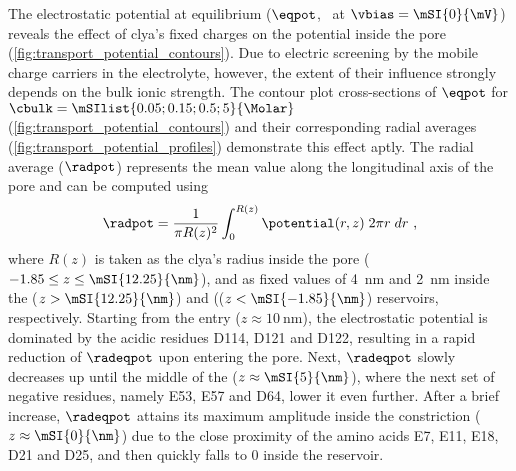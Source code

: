 The electrostatic potential at equilibrium ($\eqpot$, \ie~at $\vbias = \mSI{0}{\mV}$) reveals the effect of
\gls{clya}'s fixed charges on the potential inside the pore (\cref{fig:transport_potential_contours}). Due to
electric screening by the mobile charge carriers in the electrolyte, however, the extent of their influence
strongly depends on the bulk ionic strength. The contour plot cross-sections of $\eqpot$ for $\cbulk =
\mSIlist{0.05;0.15;0.5;5}{\Molar}$ (\cref{fig:transport_potential_contours}) and their corresponding radial
averages (\cref{fig:transport_potential_profiles}) demonstrate this effect aptly. The radial average
($\radpot$) represents the mean value along the longitudinal axis of the pore and can be computed using
%
\begin{align}\label{eq:epnp-ns_radpot}
  \radpot = \dfrac{1}{\pi R(z)^2}\int_{0}^{R(z)}\potential(r,z) \;2 \pi r \; dr \text{ ,}
\end{align}
%
where $R(z)$ is taken as the \gls{clya}'s radius inside the pore ($-1.85 \le z \le \mSI{12.25}{\nm}$), and as
fixed values of \SI{4}{\nm} and \SI{2}{\nm} inside the \cisi{} ($z > \mSI{12.25}{\nm}$) and \transi{} (($z <
\mSI{-1.85}{\nm}$) reservoirs, respectively. Starting from the \cisi{} entry ($z \approx \SI{10}{\nm}$), the
electrostatic potential is dominated by the acidic residues D114, D121 and D122, resulting in a rapid
reduction of $\radeqpot$ upon entering the pore. Next, $\radeqpot$ slowly decreases up until the middle of the
\lumen{} ($z \approx \mSI{5}{\nm}$), where the next set of negative residues, namely E53, E57 and D64, lower
it even further. After a brief increase, $\radeqpot$ attains its maximum amplitude inside the \transi{}
constriction ($z \approx \mSI{0}{\nm}$) due to the close proximity of the amino acids E7, E11, E18, D21 and
D25, and then quickly falls to \num{0} inside the \transi{} reservoir.


